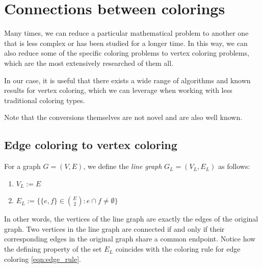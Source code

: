 \chapter{Connections between colorings}
\label{chap:clring_conversions}
 
Many times, we can reduce a particular mathematical problem to another one that is less complex or has been studied for a longer time. In this way, we can also reduce some of the specific coloring problems to vertex coloring problems, which are the most extensively researched of them all.

In our case, it is useful that there exists a wide range of algorithms and known results for vertex coloring, which we can leverage when working with less traditional coloring types.

Note that the conversions themselves are not novel and are also well known.

\section{Edge coloring to vertex coloring}

\begin{defn}
    For a graph $G = (V, E)$, we define the \emph{line graph} $G_L = (V_L, E_L)$ as follows:
    \begin{enumerate}
        \item $V_L := E$
        \item $E_L := \{ \{e, f\} \in \binom{E}{2} : e \cap f \neq \emptyset \}$
    \end{enumerate}
\end{defn}

In other words, the vertices of the line graph are exactly the edges of the original graph. Two vertices in the line graph are connected if and only if their corresponding edges in the original graph share a common endpoint. Notice how the defining property of the set $E_L$ coincides with the coloring rule for edge coloring \ref{eqn:edge_rule}.

